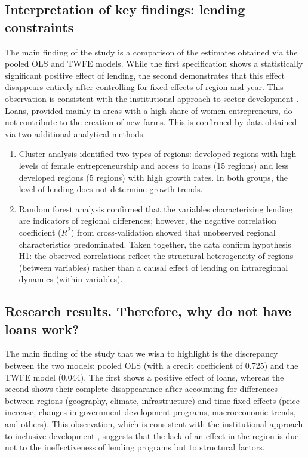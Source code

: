 ﻿\documentclass[pdflatex,sn-mathphys-ay]{sn-jnl}
\begin{document}
\subsection{Interpretation of key findings: lending constraints}

The main finding of the study is a comparison of the estimates obtained
via the pooled OLS and TWFE models. While the first specification
shows a statistically significant positive effect of lending, the second
demonstrates that this effect disappears entirely after controlling for
fixed effects of region and year. This observation is consistent with
the institutional approach to sector development \citep{ref78,ref90}. Loans, provided mainly in areas with a
high share of women entrepreneurs, do not contribute to the creation of
new farms. This is confirmed by data obtained via two additional
analytical methods.

\begin{enumerate}
\item Cluster analysis identified two types of regions: developed
regions with high levels of female entrepreneurship and access to loans
(15 regions) and less developed regions (5 regions) with high growth
rates. In both groups, the level of lending does not determine growth
trends.

\item Random forest analysis confirmed that the variables characterizing
lending are indicators of regional differences; however, the negative
correlation coefficient ($R^2$) from cross-validation showed that
unobserved regional characteristics predominated. Taken together, the
data confirm hypothesis H1: the observed correlations reflect the
structural heterogeneity of regions (between variables) rather than a
causal effect of lending on intraregional dynamics (within variables).
\end{enumerate}

\subsection{Research results. Therefore, why do not have loans work?}

The main finding of the study that we wish to highlight is the
discrepancy between the two models: pooled OLS (with a credit
coefficient of 0.725) and the TWFE model (0.044). The first shows a
positive effect of loans, whereas the second shows their complete
disappearance after accounting for differences between regions
(geography, climate, infrastructure) and time fixed effects (price
increase, changes in government development programs, macroeconomic
trends, and others). This observation, which is consistent with the institutional
approach to inclusive development \citep{ref78,ref90}, suggests that the lack of an effect in the
region is due not to the ineffectiveness of lending programs but to
structural factors.
\end{document}
